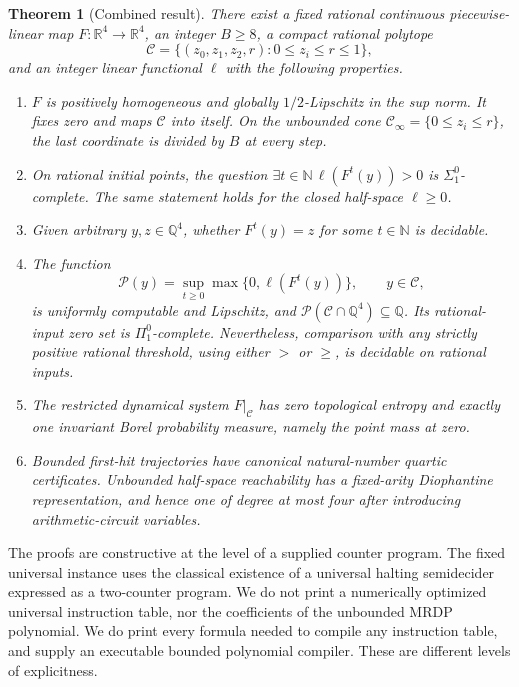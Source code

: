 \documentclass[11pt,letterpaper]{article}
\numberwithin{equation}{section}
\newtheorem{theorem}{Theorem}[section]
\theoremstyle{definition}
\theoremstyle{remark}
\newcommand{\N}{\mathbb N}
\newcommand{\Q}{\mathbb Q}
\newcommand{\R}{\mathbb R}
\newcommand{\Cone}{\mathcal C}
\newcommand{\Cinf}{\mathcal C_{\infty}}
\newcommand{\Peak}{\mathcal P}
\begin{document}
\begin{theorem}[Combined result]\label{pqc:sc:thm:main}
There exist a fixed rational continuous piecewise-linear map
$F:\R^4\to\R^4$, an integer $B\ge8$, a compact rational polytope
\[
\Cone=\{(z_0,z_1,z_2,r):0\le z_i\le r\le1\},
\]
and an integer linear functional $\ell$ with the following properties.
\begin{enumerate}[label=\textup{(\roman*)}]
\item $F$ is positively homogeneous and globally $1/2$-Lipschitz in the
sup norm. It fixes zero and maps $\Cone$ into itself. On the unbounded cone
$\Cinf=\{0\le z_i\le r\}$, the last coordinate is divided by $B$ at every step.
\item On rational initial points, the question
$\exists t\in\N\,\ell(F^t(y))>0$ is $\Sigma^0_1$-complete.
The same statement holds for the closed half-space $\ell\ge0$.
\item Given arbitrary $y,z\in\Q^4$, whether $F^t(y)=z$ for some
$t\in\N$ is decidable.
\item The function
\[
\Peak(y)=\sup_{t\ge0}\max\{0,\ell(F^t(y))\},\qquad y\in\Cone,
\]
is uniformly computable and Lipschitz, and
$\Peak(\Cone\cap\Q^4)\subseteq\Q$. Its rational-input zero set is
$\Pi^0_1$-complete. Nevertheless, comparison with any strictly positive
rational threshold, using either $>$ or $\ge$, is decidable on rational inputs.
\item The restricted dynamical system $F|_{\Cone}$ has zero topological
entropy and exactly one invariant Borel probability measure, namely the
point mass at zero.
\item Bounded first-hit trajectories have canonical natural-number
quartic certificates. Unbounded half-space reachability has a fixed-arity
Diophantine representation, and hence one of degree at most four after
introducing arithmetic-circuit variables.
\end{enumerate}
\end{theorem}

The proofs are constructive at the level of a supplied counter program.
The fixed universal instance uses the classical existence of a universal
halting semidecider expressed as a two-counter program. We do not print a
numerically optimized universal instruction table, nor the coefficients of
the unbounded MRDP polynomial. We do print every formula needed to compile
any instruction table, and supply an executable bounded polynomial compiler.
These are different levels of explicitness.
\end{document}
